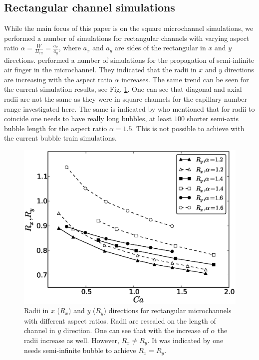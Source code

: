 \documentclass[preprint,12pt]{elsarticle}
\begin{document}
\subsection{Rectangular channel simulations}
While the main focus of this paper is on the square microchannel simulations, we performed a number
of simulations for rectangular channels with varying aspect ratio
$\alpha=\frac{W}{H_{\mathrm{eff}}}=\frac{a_x}{a_y}$, where $a_x$ and $a_y$ are sides of the rectangular in $x$ and $y$ directions.\citet{heil-threedim} performed a number of simulations for the
propagation of semi-infinite air finger in the microchannel. They indicated that the radii in $x$
and $y$ directions  are increasing with the aspect ratio $\alpha$
increases. The same trend can be seen for the current simulation results, see Fig.
\ref{fig:aspect:ratio}. One can see that diagonal and axial radii are not the same as they were in square channels for the capillary number range investigated here. The same is
indicated by \citet{heil-threedim} who mentioned that for radii to coincide one needs to have really long bubbles, at least $100$ shorter semi-axis bubble length for the aspect ratio $\alpha=1.5$. This is not possible to achieve with the
current bubble train simulations.
\begin{figure}[htb!]
\includegraphics[width=\textwidth]{rectangle.eps}
\caption{Radii in $x$ ($R_x$) and $y$ ($R_y$) directions for rectangular microchannels with
different aspect ratios. Radii are rescaled on the length of channel in $y$ direction. One can see that with
the increase of $\alpha$ the radii increase as well. However, $R_x\neq R_y$. It was indicated by \citet{heil-threedim} one needs semi-infinite bubble to achieve $R_x=R_y$. \label{fig:aspect:ratio}}
\end{figure}
\end{document}
